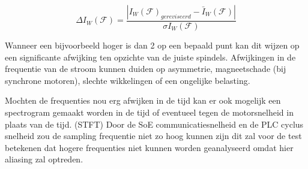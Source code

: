 {\begin{equation}
	\Delta I_W\left(\mathcal{F}\right)=\frac{\left|{I_W\left(\mathcal{F}\right)}_{gereviseerd}-{\bar{I}}_W\left(\mathcal{F}\right)\right|}{{\sigma I}_W\left(\mathcal{F}\right)}
\end{equation}

Wanneer een bijvoorbeeld hoger is dan 2 op een bepaald punt kan dit wijzen op een significante afwijking ten opzichte van de juiste spindels. Afwijkingen in de frequentie van de stroom kunnen duiden op asymmetrie, magneetschade (bij synchrone motoren), slechte wikkelingen of een ongelijke belasting. 

}{Mochten de frequenties nou erg afwijken in de tijd kan er ook mogelijk een spectrogram gemaakt worden in de tijd of eventueel tegen de motorsnelheid in plaats van de tijd. (\gls{STFT}) \cite{web:STFT}
Door de \gls{SoE} communicatiesnelheid en de \gls{PLC} cyclus snelheid zou de sampling frequentie niet zo hoog kunnen zijn dit zal voor de test betekenen dat hogere frequenties niet kunnen worden geanalyseerd omdat hier aliasing zal optreden.
}